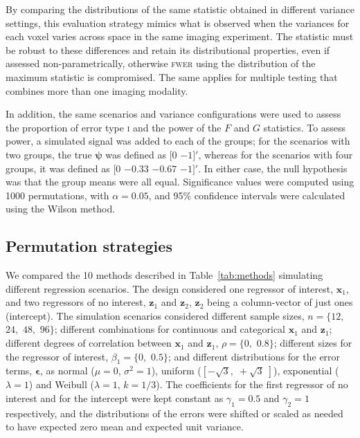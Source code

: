 By comparing the distributions of the same statistic obtained in different variance settings, this evaluation strategy mimics what is observed when the variances for each voxel varies across space in the same imaging experiment. The statistic must be robust to these differences and retain its distributional properties, even if assessed non-parametrically, otherwise \textsc{fwer} using the distribution of the maximum statistic is compromised. The same applies for multiple testing that combines more than one imaging modality.

In addition, the same scenarios and variance configurations were used to assess the proportion of error type \textsc{i} and the power of the $F$ and $G$ statistics. To assess power, a simulated signal was added to each of the groups; for the scenarios with two groups, the true $\boldsymbol{\psi}$ was defined as $[0$ $-1]'$, whereas for the scenarios with four groups, it was defined as $[0$  $-0.33$ $-0.67$ $-1]'$. In either case, the null hypothesis was that the group means were all equal. Significance values were computed using 1000 permutations, with $\alpha=0.05$, and 95\% confidence intervals were calculated using the Wilson method.

\subsection{Permutation strategies}
\label{sec:method_perm}

We compared the 10 methods described in Table~\ref{tab:methods} simulating different regression scenarios. The design considered one regressor of interest, $\mathbf{x}_{1}$, and two regressors of no interest, $\mathbf{z}_{1}$ and $\mathbf{z}_{2}$, $\mathbf{z}_{2}$ being a column-vector of just ones (intercept). The simulation scenarios considered different sample sizes, $n=\{12,$ $24,$ $48,$ $96\}$; different combinations for continuous and categorical $\mathbf{x}_{1}$ and $\mathbf{z}_{1}$; different degrees of correlation between $\mathbf{x}_{1}$ and $\mathbf{z}_{1}$, $\rho = \{0,$ $0.8\}$; different sizes for the regressor of interest, $\beta_{1}=\{0,$ $0.5\}$; and different distributions for the error terms, $\boldsymbol{\epsilon}$, as normal ($\mu=0$, $\sigma^2=1$), uniform ($\left[-\sqrt{3},\; +\sqrt{3}\;\right]$), exponential ($\lambda=1$) and Weibull ($\lambda=1$, $k=1/3$). The coefficients for the first regressor of no interest and for the intercept were kept constant as $\gamma_{1}=0.5$ and $\gamma_{2}=1$ respectively, and the distributions of the errors were shifted or scaled as needed to have expected zero mean and expected unit variance.

